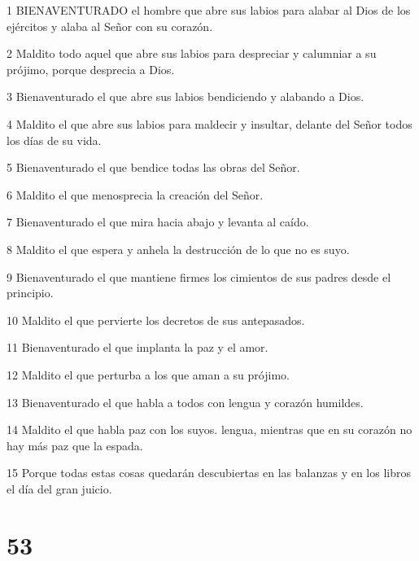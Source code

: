 \par 1 BIENAVENTURADO el hombre que abre sus labios para alabar al Dios de los ejércitos y alaba al Señor con su corazón.

\par 2 Maldito todo aquel que abre sus labios para despreciar y calumniar a su prójimo, porque desprecia a Dios.

\par 3 Bienaventurado el que abre sus labios bendiciendo y alabando a Dios.

\par 4 Maldito el que abre sus labios para maldecir y insultar, delante del Señor todos los días de su vida.

\par 5 Bienaventurado el que bendice todas las obras del Señor.

\par 6 Maldito el que menosprecia la creación del Señor.

\par 7 Bienaventurado el que mira hacia abajo y levanta al caído.

\par 8 Maldito el que espera y anhela la destrucción de lo que no es suyo.

\par 9 Bienaventurado el que mantiene firmes los cimientos de sus padres desde el principio.

\par 10 Maldito el que pervierte los decretos de sus antepasados.

\par 11 Bienaventurado el que implanta la paz y el amor.

\par 12 Maldito el que perturba a los que aman a su prójimo.

\par 13 Bienaventurado el que habla a todos con lengua y corazón humildes.

\par 14 Maldito el que habla paz con los suyos. lengua, mientras que en su corazón no hay más paz que la espada.

\par 15 Porque todas estas cosas quedarán descubiertas en las balanzas y en los libros el día del gran juicio.

\chapter{53}

